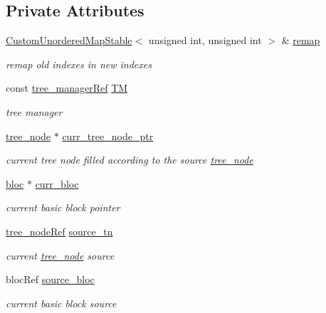 \subsection*{Private Attributes}
\begin{DoxyCompactItemize}
\item 
\hyperlink{custom__map_8hpp_a7314a7df1cdb3a3acf478ab86e95c226}{Custom\+Unordered\+Map\+Stable}$<$ unsigned int, unsigned int $>$ \& \hyperlink{structtree__node__dup_adb6daacfe939aadae03ffe451dddcb7c}{remap}
\begin{DoxyCompactList}\small\item\em remap old indexes in new indexes \end{DoxyCompactList}\item 
const \hyperlink{tree__manager_8hpp_a96ff150c071ce11a9a7a1e40590f205e}{tree\+\_\+manager\+Ref} \hyperlink{structtree__node__dup_a17f78b4a3bea2bccfbbfab4083a0268c}{TM}
\begin{DoxyCompactList}\small\item\em tree manager \end{DoxyCompactList}\item 
\hyperlink{classtree__node}{tree\+\_\+node} $\ast$ \hyperlink{structtree__node__dup_a1d264d794a19a71be0b3bdcfbfc95c61}{curr\+\_\+tree\+\_\+node\+\_\+ptr}
\begin{DoxyCompactList}\small\item\em current tree node filled according to the source \hyperlink{classtree__node}{tree\+\_\+node} \end{DoxyCompactList}\item 
\hyperlink{structbloc}{bloc} $\ast$ \hyperlink{structtree__node__dup_a8e2b30d16eb2ba7d1aaba8329ad46549}{curr\+\_\+bloc}
\begin{DoxyCompactList}\small\item\em current basic block pointer \end{DoxyCompactList}\item 
\hyperlink{tree__node_8hpp_a6ee377554d1c4871ad66a337eaa67fd5}{tree\+\_\+node\+Ref} \hyperlink{structtree__node__dup_a1a1e82473bea3953d902dcf5aea0c0fa}{source\+\_\+tn}
\begin{DoxyCompactList}\small\item\em current \hyperlink{classtree__node}{tree\+\_\+node} source \end{DoxyCompactList}\item 
bloc\+Ref \hyperlink{structtree__node__dup_a630ad8c68077769d7a4965c7a0eb64ea}{source\+\_\+bloc}
\begin{DoxyCompactList}\small\item\em current basic block source \end{DoxyCompactList}\end{DoxyCompactItemize}


